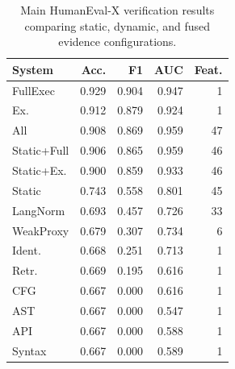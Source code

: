 \begin{table}[!htbp]
\centering
\scriptsize
\begin{tabular}{lrrrr}
\toprule
System & Acc. & F1 & AUC & Feat. \\
\midrule
FullExec & 0.929 & 0.904 & 0.947 & 1 \\
Ex. & 0.912 & 0.879 & 0.924 & 1 \\
All & 0.908 & 0.869 & 0.959 & 47 \\
Static+Full & 0.906 & 0.865 & 0.959 & 46 \\
Static+Ex. & 0.900 & 0.859 & 0.933 & 46 \\
Static & 0.743 & 0.558 & 0.801 & 45 \\
LangNorm & 0.693 & 0.457 & 0.726 & 33 \\
WeakProxy & 0.679 & 0.307 & 0.734 & 6 \\
Ident. & 0.668 & 0.251 & 0.713 & 1 \\
Retr. & 0.669 & 0.195 & 0.616 & 1 \\
CFG & 0.667 & 0.000 & 0.616 & 1 \\
AST & 0.667 & 0.000 & 0.547 & 1 \\
API & 0.667 & 0.000 & 0.588 & 1 \\
Syntax & 0.667 & 0.000 & 0.589 & 1 \\
\bottomrule
\end{tabular}
\vspace{0.5em}
\caption{Main HumanEval-X verification results comparing static, dynamic, and fused evidence configurations.}
\label{tab:main-results}
\end{table}
